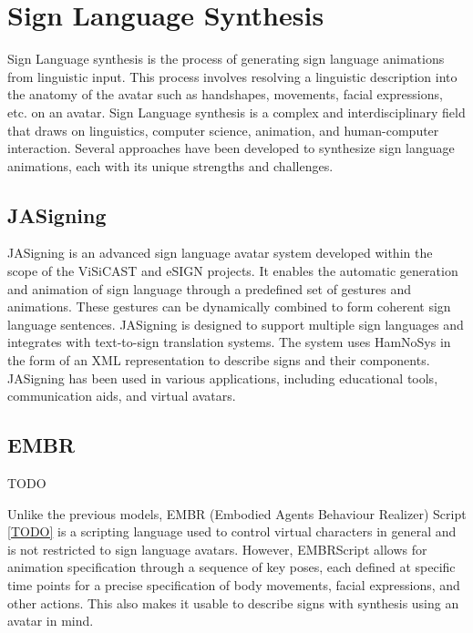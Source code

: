 \documentclass[../../main.tex]{subfiles}
\begin{document}


\section{Sign Language Synthesis}

Sign Language synthesis is the process of generating sign language animations from linguistic input. This process involves resolving a linguistic description into the anatomy of the avatar such as handshapes, movements, facial expressions, etc. on an avatar.  Sign Language synthesis is a complex and interdisciplinary field that draws on linguistics, computer science, animation, and human-computer interaction. Several approaches have been developed to synthesize sign language animations, each with its unique strengths and challenges.

\subsection{JASigning}

JASigning is an advanced sign language avatar system developed within the scope of the ViSiCAST and eSIGN projects\cite{TODO}. It enables the automatic generation and animation of sign language through a predefined set of gestures and animations. These gestures can be dynamically combined to form coherent sign language sentences. JASigning is designed to support multiple sign languages and integrates with text-to-sign translation systems. The system uses HamNoSys in the form of an XML representation\cite{TODO} to describe signs and their components. JASigning has been used in various applications, including educational tools, communication aids, and virtual avatars.


\subsection{EMBR}

TODO

Unlike the previous models, EMBR (Embodied Agents Behaviour Realizer) Script \ref{TODO} is a scripting language used to control virtual characters in general and is not restricted to sign language avatars. However, EMBRScript allows for animation specification through a sequence of key poses, each defined at specific time points for a precise specification of body movements, facial expressions, and other actions. This also makes it usable to describe signs with synthesis using an avatar in mind.
\end{document}
